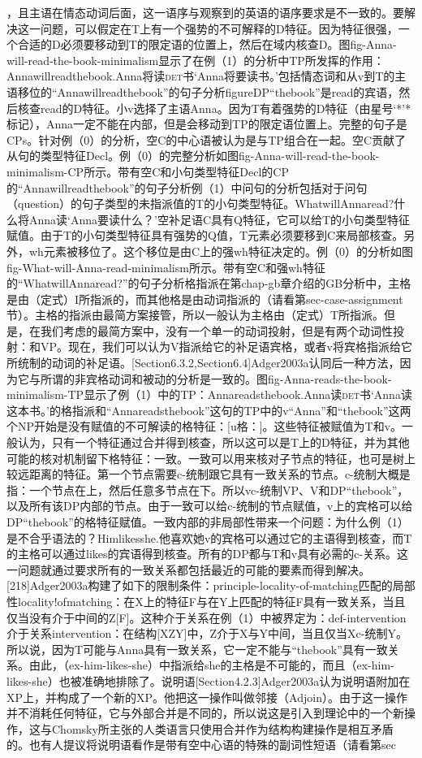 ，且主语在情态动词后面，这一语序与观察到的英语的语序要求是不一致的。要解决这一问题，可以假定在T上有一个强势的不可解释的D特征。因为特征很强，一个合适的D必须要移动到T的限定语的位置上，然后在域内核查D。图fig-Anna-will-read-the-book-minimalism显示了在例（1）的分析中TP所发挥的作用：Annawillreadthebook.Anna将读\textsc{det}书`Anna将要读书。'包括情态词和从v到T的主语移位的“Annawillreadthebook”的句子分析figureDP“thebook”是read的宾语，然后核查read的D特征。小v选择了主语Anna。因为T有着强势的D特征（由星号`*'*标记），Anna一定不能在内部，但是会移动到TP的限定语位置上。完整的句子是CPs。针对例（0）的分析，空C的中心语被认为是与TP组合在一起。空C贡献了从句的类型特征Decl。例（0）的完整分析如图fig-Anna-will-read-the-book-minimalism-CP所示。带有空C和小句类型特征Decl的CP的“Annawillreadthebook”的句子分析例（1）中问句的分析包括对于问句（question）的句子类型的未指派值的T的小句类型特征。WhatwillAnnaread?什么将Anna读`Anna要读什么？'空补足语C具有Q特征，它可以给T的小句类型特征赋值。由于T的小句类型特征具有强势的Q值，T元素必须要移到C来局部核查。另外，wh元素被移位了。这个移位是由C上的强wh特征决定的。例（0）的分析如图fig-What-will-Anna-read-minimalism所示。带有空C和强wh特征的“WhatwillAnnaread?”的句子分析格指派在第chap-gb章介绍的GB分析中，主格是由（定式）I所指派的，而其他格是由动词指派的（请看第sec-case-assignment节）。主格的指派由最简方案接管，所以一般认为主格由（定式）T所指派。但是，在我们考虑的最简方案中，没有一个单一的动词投射，但是有两个动词性投射：和VP。现在，我们可以认为V指派给它的补足语宾格，或者v将宾格指派给它所统制的动词的补足语。[Section6.3.2,Section6.4]Adger2003a认同后一种方法，因为它与所谓的非宾格动词和被动的分析是一致的。图fig-Anna-reads-the-book-minimalism-TP显示了例（1）中的TP：Annareadsthebook.Anna读\textsc{det}书`Anna读这本书。'的格指派和“Annareadsthebook”这句的TP中的v“Anna”和“thebook”这两个NP开始是没有赋值的不可解读的格特征：[u格：]。这些特征被赋值为T和v。一般认为，只有一个特征通过合并得到核查，所以这可以是T上的D特征，并为其他可能的核对机制留下格特征：一致。一致可以用来核对子节点的特征，也可是树上较远距离的特征。第一个节点需要c-统制跟它具有一致关系的节点。c-统制大概是指：一个节点在上，然后任意多节点在下。所以vc-统制VP、V和DP“thebook”，以及所有该DP内部的节点。由于一致可以给c-统制的节点赋值，v上的宾格可以给DP“thebook”的格特征赋值。一致内部的非局部性带来一个问题：为什么例（1）是不合乎语法的？Himlikesshe.他喜欢她v的宾格可以通过它的主语得到核查，而T的主格可以通过likes的宾语得到核查。所有的DP都与T和v具有必需的c-关系。这一问题就通过要求所有的一致关系都包括最近的可能的要素而得到解决。[218]Adger2003a构建了如下的限制条件：principle-locality-of-matching匹配的局部性locality!ofmatching：在X上的特征F与在Y上匹配的特征F具有一致关系，当且仅当没有介于中间的Z[F]。这种介于关系在例（1）中被界定为：def-intervention介于关系intervention：在结构[XZY]中，Z介于X与Y中间，当且仅当Xc-统制Y。所以说，因为T可能与Anna具有一致关系，它一定不能与“thebook”具有一致关系。由此，（ex-him-likes-she）中指派给she的主格是不可能的，而且（ex-him-likes-she）也被准确地排除了。说明语[Section4.2.3]Adger2003a认为说明语附加在XP上，并构成了一个新的XP。他把这一操作叫做邻接（Adjoin）。由于这一操作并不消耗任何特征，它与外部合并是不同的，所以说这是引入到理论中的一个新操作，这与Chomsky所主张的人类语言只使用合并作为结构构建操作是相互矛盾的。也有人提议将说明语看作是带有空中心语的特殊的副词性短语（请看第sec